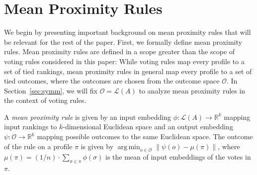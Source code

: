 \documentclass[prodmode,acmec]{ec-acmsmall}
\newcommand{\calL}{{\mathcal{L}}}
\newcommand{\rank}{{\calL(A)}}
\newcommand{\calO}{{\mathcal{O}}}
\DeclareMathOperator*{\argmin}{arg\,min}
\newcommand{\kibitz}[2]{\ifnum\Comments=1\textcolor{#1}{#2}\fi}
\newcommand{\ns}[1]{\kibitz{red} {[NS: #1]}}
\begin{document}



\section{Mean Proximity Rules}
\label{sec:mpr}

We begin by  presenting important background on mean proximity rules that will be relevant for the rest of the paper. First, we formally define mean proximity rules. Mean proximity rules are defined in a scope greater than the scope of voting rules considered in this paper: While voting rules map every profile to a set of tied rankings, mean proximity rules in general map every profile to a set of tied outcomes, where the outcomes are chosen from the outcome space $\calO$. In Section~\ref{sec:symm}, we will fix $\calO = \rank$ to analyze mean proximity rules in the context of voting rules. 

\begin{definition}
A \emph{mean proximity rule} is given by an input embedding $\phi: \rank \rightarrow \mathbb{R}^k$ mapping input rankings to $k$-dimensional Euclidean space and an output embedding $\psi: \calO \rightarrow \mathbb{R}^k$ mapping possible outcomes to the same Euclidean space. The outcome of the rule on a profile $\pi$ is given by $\argmin_{o \in \calO} \|\psi(o) - \mu(\pi) \|$, where $\mu(\pi) = (1/n) \cdot \sum_{\sigma \in \pi} \phi(\sigma)$ is the mean of input embeddings of the votes in $\pi$.
\end{definition}
\end{document}
